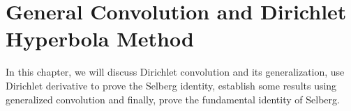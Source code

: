 \documentclass[elemannt.tex]{subfile}
\begin{document}
    \section{General Convolution and Dirichlet Hyperbola Method}
    In this chapter, we will discuss Dirichlet convolution and its generalization, use Dirichlet derivative to prove the Selberg identity, establish some results using generalized convolution and finally, prove the fundamental identity of Selberg.
\end{document}
